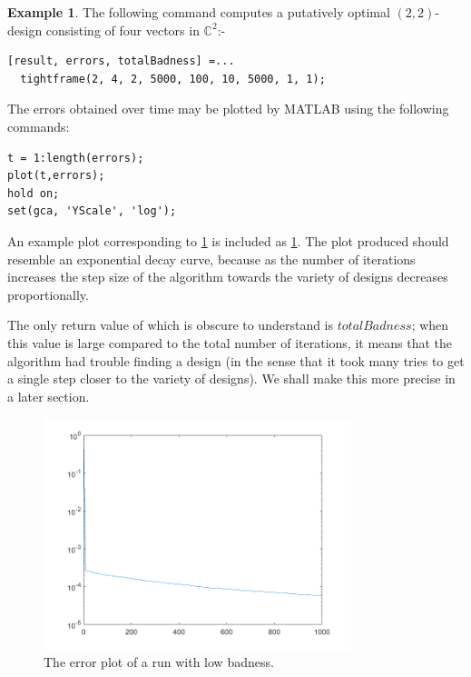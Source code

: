 \documentclass{article}
\newcommand{\C}{\mathbb{C}}
\theoremstyle{definition}
\newtheorem{ex}{Example}
\begin{document}
  \begin{ex}\label{ex:dnt_2_4_2}
    The following command computes a putatively optimal $ (2,2)$-design consisting of four vectors in $ \C^2 $:-
    \begin{lstlisting}
[result, errors, totalBadness] =...
  tightframe(2, 4, 2, 5000, 100, 10, 5000, 1, 1);
    \end{lstlisting}
  \end{ex}

  The errors obtained over time may be plotted by MATLAB using the following commands:
  \begin{lstlisting}
t = 1:length(errors);
plot(t,errors);
hold on;
set(gca, 'YScale', 'log');
  \end{lstlisting}
  An example plot corresponding to \cref{ex:dnt_2_4_2} is included as \cref{fig:example_error_plot}.
  The plot produced should resemble an exponential decay curve, because as the number of iterations increases
  the step size of the algorithm towards the variety of designs decreases proportionally.

  The only return value of  which is obscure to understand is $ totalBadness $; when
  this value is large compared to the total number of iterations, it means that the algorithm had trouble
  finding a design (in the sense that it took many tries to get a single step closer to the variety of
  designs). We shall make this more precise in a later section.

  \begin{figure}
    \centering
    \includegraphics[width=0.8\textwidth]{example_error_plot}
    \caption{The error plot of a run with low badness.\label{fig:example_error_plot}}
  \end{figure}
\end{document}
